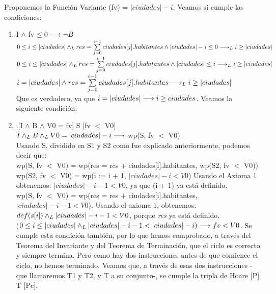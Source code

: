 \documentclass[10pt,a4paper]{article}
\begin{document}
    Proponemos la Función Variante (fv) = $|ciudades| - i$. Veamos si cumple las condiciones:\\
\begin{enumerate} \setlength\itemsep{0cm}
    \item I $\wedge$ fv $\leq 0  \longrightarrow \neg B$\\

    $0 \leq i \leq |ciudades| \land _L res = \sum\limits_{j=0}^{i - 1}ciudades[j].habitantes \wedge |ciudades| - i \leq 0 \longrightarrow _L i \geq |ciudades|$ \\
    
    $0 \leq i \leq |ciudades| \land _L res = \sum\limits_{j=0}^{i - 1}ciudades[j].habitantes \wedge |ciudades| \leq i \longrightarrow _L i \geq |ciudades|$ \\

    $i = |ciudades| \wedge  res = \sum\limits_{j=0}^{i - 1}ciudades[j].habitantes \longrightarrow _L i \geq |ciudades|$\\

    Que es verdadero, ya que $i = |ciudades| \longrightarrow i \geq ciudades$. Veamos la siguiente condición.\\

    \item .[I $\wedge$ B $\wedge$ V0 = fv] S [fv $<$ V0]\\

    $I \land _L B \land _L V0 = |ciudades| - i \longrightarrow$ wp(S, fv $<$ V0)\\
    
    Usando S, dividido en S1 y S2 como fue explicado anteriormente, podemos decir que:\\
    
    wp(S, fv $<$ V0) = wp(res = res + ciudades[i].habitantes, wp(S2, fv $<$ V0))\\

    wp(S2, fv $<$ V0) = wp(i := i + 1, $|ciudades| - i < V0$) Usando el Axioma 1 obtenemos: $|ciudades| - i - 1 < V0$, ya que (i + 1) ya está definido.\\

    wp(S, fv $<$ V0) = wp(res = res + ciudades[i].habitantes, $|ciudades| - i - 1 < V0$). Usando el axioma 1, obtenemos: $def (s[i]) \land _L |ciudades| - i - 1 < V0$, porque \textit{res} ya está definido.\\

    ($0\leq i \leq |ciudades| \land _L |ciudades| - i - 1 < |ciudades| - i) \longrightarrow fv < V0$. Se cumple esta condición también, por lo que hemos comprobado, a través del Teorema del Invariante y del Teorema de Terminación, que el ciclo es correcto y siempre termina. Pero como hay dos instrucciones antes de que comience el ciclo, no hemos terminado. Veamos que, a través de esas dos instrucciones -que llamaremos T1 y T2, y T a su conjunto-, se cumple la tripla de Hoare [P] T [Pc]. \\


\end{enumerate}
\end{document}
